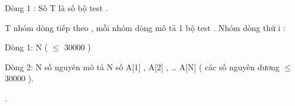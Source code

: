 Dòng 1 : Số T là số bộ test .   


   T nhóm dòng tiếp theo , mỗi nhóm dòng mô tả 1 bộ test . Nhóm dòng thứ i :   


   Dòng 1: N (  $\le$  30000 )   


   Dòng 2: N số nguyên mô tả N số A[1] , A[2] , … A[N] ( các số nguyên dương  $\le$  30000 ).   


   .